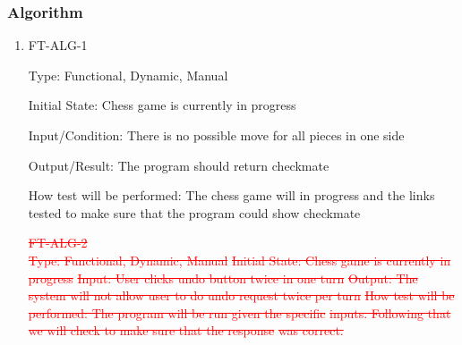 \documentclass[12pt, titlepage]{article}
\begin{document}
\begin{enumerate}

\end{enumerate}

\subsubsection{Algorithm}

\begin{enumerate}

\item{FT-ALG-1\\}

Type: Functional, Dynamic, Manual
					
Initial State: Chess game is currently in progress
					
Input/Condition: There is no possible move for all pieces in one side
					
Output/Result: The program should return checkmate 
					
How test will be performed: The chess game will in progress and the links tested to make sure that the program could show checkmate 
		
\textcolor{red}	{		
\sout{FT-ALG-2\\}
}
\textcolor{red}{
\sout{Type: Functional, Dynamic, Manual}		
\sout{Initial State: Chess game is currently in progress}			
\sout{Input: User clicks undo button twice in one turn}				
\sout{Output: The system will not allow user to do undo request twice per turn}					
\sout{How test will be performed: The program will be run given the specific }
\sout{inputs. Following that we will check to make sure that the response }
\sout{was correct. }}

\\


\end{enumerate}
\end{document}
